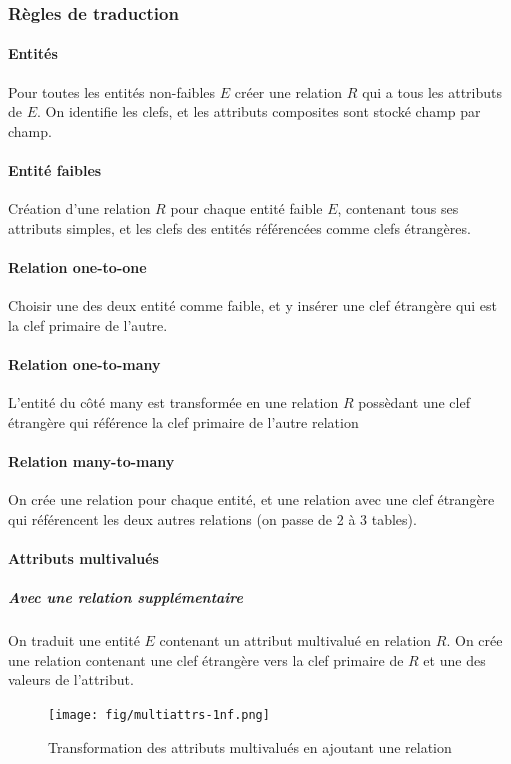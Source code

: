 \documentclass[a4paper]{article}
\begin{document}
\subsubsection{Règles de traduction}
\paragraph{Entités}
Pour toutes les entités non-faibles $E$ créer une relation $R$ qui a tous les attributs
de $E$. On identifie les clefs, et les attributs composites sont stocké champ par champ.

\paragraph{Entité faibles}
Création d'une relation $R$ pour chaque entité faible $E$, contenant tous ses
attributs simples, et les clefs des entités référencées comme clefs étrangères.

\paragraph{Relation one-to-one}
Choisir une des deux entité comme faible, et y insérer une clef étrangère qui
est la clef primaire de l'autre.

\paragraph{Relation one-to-many}
L'entité du côté many est transformée en une relation $R$ possèdant une clef étrangère
qui référence la clef primaire de l'autre relation

\paragraph{Relation many-to-many}
On crée une relation pour chaque entité, et une relation avec une clef étrangère
qui référencent les deux autres relations (on passe de 2 à 3 tables).

\paragraph{Attributs multivalués}
\subparagraph{Avec une relation supplémentaire}
On traduit une entité $E$ contenant un attribut multivalué en relation $R$.
On crée une relation contenant une clef étrangère vers la clef primaire de $R$ et
une des valeurs de l'attribut.
\begin{figure}[H]
    \center
    \texttt{[image: fig/multiattrs-1nf.png]}
    \caption{Transformation des attributs multivalués en ajoutant une relation}
\end{figure}
\end{document}
